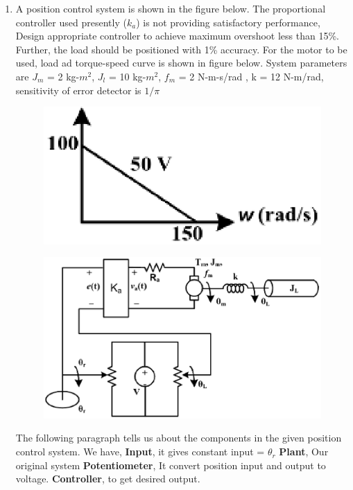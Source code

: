 \begin{enumerate}[label=\thesection.\arabic*.,ref=\thesection.\theenumi]
\item A position control system is shown in the figure below. The proportional controller used presently ($k_a$) is not providing satisfactory performance, Design appropriate controller to achieve maximum overshoot less than 15\%. Further, the load should be positioned with 1\% accuracy. For the motor to be used, load ad torque-speed curve is shown in figure below. System parameters are $J_m$ = 2 kg-$m^2$, $J_l$ = 10 kg-$m^2$, $f_m$ = 2 N-m-s/rad , k = 12 N-m/rad, sensitivity of error detector is $1/\pi$

\begin{figure}[!ht]
\centering
    \includegraphics[width=150 pt,height = 75 pt]{./figs/ee18btech11019_1.eps}
  \caption{}
  \label{fig:ee18btech11019_fig1}
\end{figure}


\begin{figure}[!ht]
    \includegraphics[width=\columnwidth]{./figs/ee18btech11019_2.eps}
  \caption{}
  \label{fig:ee18btech11019_fig2}
\end{figure}


\solution The following paragraph tells us about the components in the given position control system.\newline
We have, \newline
\textbf{Input}, it gives constant input = $\theta_r$\newline
\textbf{Plant}, Our original system\newline
\textbf{Potentiometer}, It convert position input and output to voltage.\newline
\textbf{Controller}, to get desired output.\newline


\end{enumerate}
